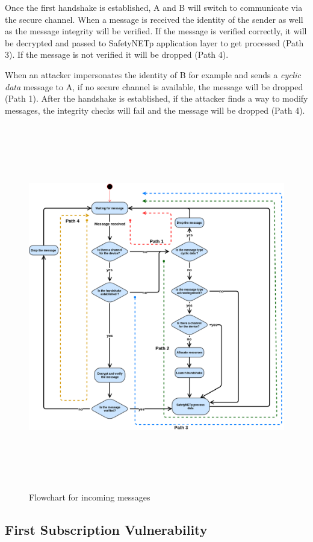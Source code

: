 Once the first handshake is established, A and B will switch to
communicate via the secure channel. When a message is received the identity of the sender as well as
the message integrity will be verified. If the message is verified correctly, it will be decrypted and passed to SafetyNETp
application layer to get processed (Path 3). If the message is not verified it will be dropped (Path 4).

When an attacker impersonates the identity of B for example and sends a \textit{cyclic data} message to A,
if no secure channel is available, the message will be dropped (Path 1). After the handshake is established, if the attacker
finds a way to modify messages, the integrity checks will fail and the message will be dropped (Path 4).

\begin{figure}[p]
\centering
\includegraphics[height=16cm]{figures/design/incoming_messages_flowtchart.jpg}
\caption{Flowchart for incoming messages}\label{incoming_messages_flowtchart}
\end{figure}
\newpage

\subsection{First Subscription Vulnerability}

